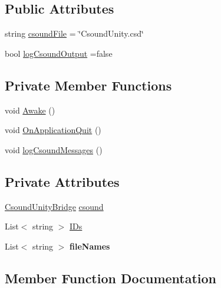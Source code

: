 \subsection*{Public Attributes}
\begin{DoxyCompactItemize}
\item 
string \hyperlink{class_csound_unity_af1554e17f6554a2b17d0b25c1e477b4f}{csound\+File} = \char`\"{}Csound\+Unity.\+csd\char`\"{}
\item 
bool \hyperlink{class_csound_unity_a82c718d7b9393a4afb5d231e0bbef663}{log\+Csound\+Output} =false
\end{DoxyCompactItemize}
\subsection*{Private Member Functions}
\begin{DoxyCompactItemize}
\item 
void \hyperlink{class_csound_unity_af053c33dc16979fcf4cbaf4ebf435da4}{Awake} ()
\item 
void \hyperlink{class_csound_unity_a24c6bab026ac4366b8cb300c88e1b828}{On\+Application\+Quit} ()
\item 
void \hyperlink{class_csound_unity_aca5e8602587a1cbe53e0c78832572051}{log\+Csound\+Messages} ()
\end{DoxyCompactItemize}
\subsection*{Private Attributes}
\begin{DoxyCompactItemize}
\item 
\hyperlink{class_csound_unity_bridge}{Csound\+Unity\+Bridge} \hyperlink{class_csound_unity_ab048ec161ff3c72eeded70d692e28e7a}{csound}
\item 
List$<$ string $>$ \hyperlink{class_csound_unity_a7b8bf3df0f6b36a6509c45d71b1f202d}{I\+Ds}
\item 
\hypertarget{class_csound_unity_aa449d1e9c66e54eb662ab86cb7e896df}{}List$<$ string $>$ {\bfseries file\+Names}\label{class_csound_unity_aa449d1e9c66e54eb662ab86cb7e896df}

\end{DoxyCompactItemize}


\subsection{Member Function Documentation}
\hypertarget{class_csound_unity_a91ce642f08df0b6612beed99120cf526}{}
